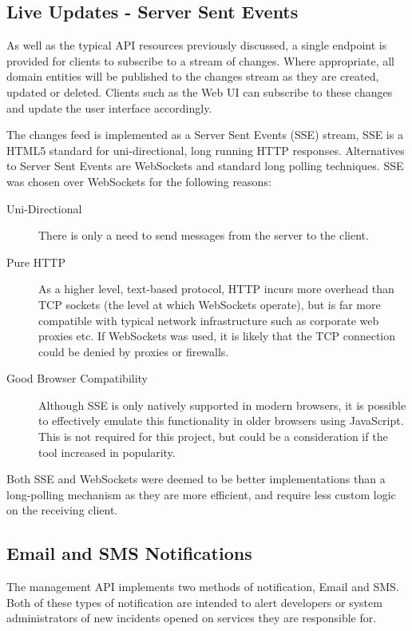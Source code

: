 \documentclass{cshonours}
\begin{document}
\subsection{Live Updates - Server Sent Events}

As well as the typical API resources previously discussed, a single endpoint is provided for clients to subscribe to a stream of changes. Where appropriate, all domain entities will be published to the changes stream as they are created, updated or deleted. Clients such as the Web UI can subscribe to these changes and update the user interface accordingly.

The changes feed is implemented as a Server Sent Events (SSE) stream, SSE is a HTML5 standard for uni-directional, long running HTTP responses. Alternatives to Server Sent Events are WebSockets and standard long polling techniques. SSE was chosen over WebSockets for the following reasons:

\begin{description}
  \item[Uni-Directional] There is only a need to send messages from the server to the client.
  \item[Pure HTTP] As a higher level, text-based protocol, HTTP incurs more overhead than TCP sockets (the level at which WebSockets operate), but is far more compatible with typical network infrastructure such as corporate web proxies etc. If WebSockets was used, it is likely that the TCP connection could be denied by proxies or firewalls.
  \item[Good Browser Compatibility] Although SSE is only natively supported in modern browsers, it is possible to effectively emulate this functionality in older browsers using JavaScript. This is not required for this project, but could be a consideration if the tool increased in popularity.
\end{description}

Both SSE and WebSockets were deemed to be better implementations than a long-polling mechanism as they are more efficient, and require less custom logic on the receiving client.

\pagebreak
\subsection{Email and SMS Notifications}
\label{notifications}

The management API implements two methods of notification, Email and SMS. Both of these types of notification are intended to alert developers or system administrators of new incidents opened on services they are responsible for.
\end{document}
